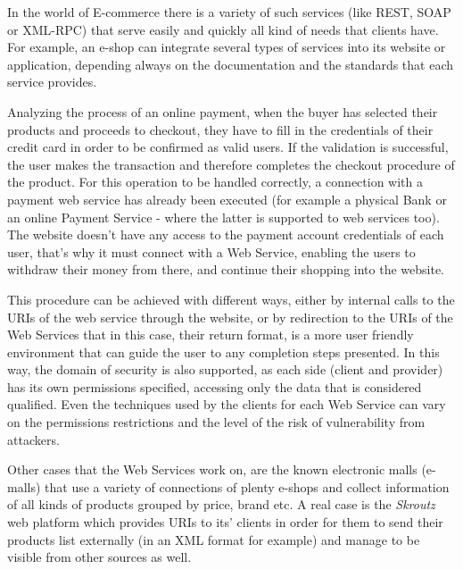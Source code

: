 \documentclass[12pt]{article}
\begin{document}
	In the world of E-commerce there is a variety of such services (like REST, SOAP or XML-RPC) that serve easily and quickly all kind of needs that clients have. For example, an e-shop can integrate several types of services into its website or application, depending always on the documentation and the standards that each service provides.
	
	Analyzing the process of an online payment, when the buyer has selected their products and proceeds to checkout, they have to fill in the credentials of their credit card in order to be confirmed as valid users. If the validation is successful, the user makes the transaction and therefore completes the checkout procedure of the product. For this operation to be handled correctly, a connection with a payment web service has already been executed (for example a physical Bank or an online Payment Service - where the latter is supported to web services too). The website doesn't have any access to the payment account credentials of each user, that's why it must connect with a Web Service, enabling the users to withdraw their money from there, and continue their shopping into the website. 
	
	This procedure can be achieved with different ways, either by internal calls to the URIs of the web service through the website, or by redirection to the URIs of the Web Services that in this case, their return format, is a more user friendly environment that can guide the user to any completion steps presented. In this way, the domain of security is also supported, as each side (client and provider) has its own permissions specified, accessing only the data that is considered qualified. Even the techniques used by the clients for each Web Service can vary on the permissions restrictions and the level of the risk of vulnerability from attackers.
	
	Other cases that the Web Services work on, are the known electronic malls (e-malls) that use a variety of connections of plenty e-shops and collect information of all kinds of products grouped by price, brand etc. A real case is the \textit{Skroutz} web platform which provides URIs to its' clients in order for them to send their products list externally (in an XML format for example) and manage to be visible from other sources as well.
	
\end{document}
